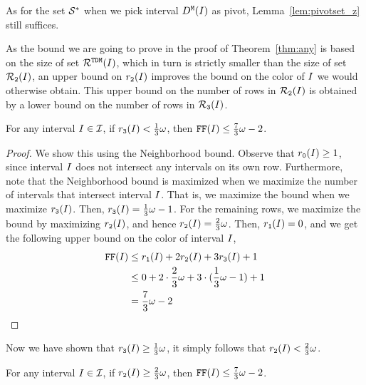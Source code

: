 {As for the set $\mathcal{S}^*$ when we pick interval $D^\texttt{M}(I)$ as pivot, Lemma~\ref{lem:pivotset_z} still suffices.

\medskip



As the bound we are going to prove in the proof of Theorem~\ref{thm:any} is based on the size of set $\mathcal{R}^{\texttt{TDM}}(I)$, which in turn is strictly smaller than the size of set $\mathcal{R}_\texttt{2}(I)$, an upper bound on $r_\texttt{2}(I)$ improves the bound on the color of $I$ we would otherwise obtain.
This upper bound on the number of rows in $\mathcal{R}_\texttt{2}(I)$ is obtained by a lower bound on the number of rows in $\mathcal{R}_\texttt{3}(I)$.

\begin{lemma}
    \label{lem:r3_lb}
    For any interval $I \in \mathcal{I}$, if $r_\texttt{3}(I) < \frac{1}{3}\omega$, then $\text{\texttt{FF}}(I) \leq \frac{7}{3} \omega - 2$.
\end{lemma}

\begin{proof}
    We show this using the Neighborhood bound.
    Observe that $r_\texttt{0}(I) \geq 1$, since interval $I$ does not intersect any intervals on its own row.
    Furthermore, note that the Neighborhood bound is maximized when we maximize the number of intervals that intersect interval $I$.
    That is, we maximize the bound when we maximize $r_\texttt{3}(I)$.
    Then, $r_\texttt{3}(I) = \frac{1}{3}\omega - 1$.
    For the remaining rows, we maximize the bound by maximizing $r_\texttt{2}(I)$, and hence $r_\texttt{2}(I) = \frac{2}{3}\omega$.
    Then, $r_\texttt{1}(I) = 0$, and we get the following upper bound on the color of interval $I$,
    \begin{align*}
        \text{\texttt{FF}}(I) &\leq r_\texttt{1}(I) + 2r_\texttt{2}(I) + 3r_\texttt{3}(I) + 1 \\
            &\leq 0 + 2 \cdot \frac{2}{3} \omega + 3 \cdot (\frac{1}{3}\omega - 1) + 1\\
            &= \frac{7}{3} \omega - 2
    \end{align*}
\end{proof}

Now we have shown that $r_\texttt{3}(I) \geq \frac{1}{3}\omega$, it simply follows that $r_\texttt{2}(I) < \frac{2}{3}\omega$.

\begin{corollary}
    \label{cor:r2_bound}
    For any interval $I \in \mathcal{I}$, if $r_\texttt{2}(I) \geq \frac{2}{3} \omega$, then $\text{\texttt{FF}}(I) \leq \frac{7}{3} \omega - 2$. 
\end{corollary}

}
